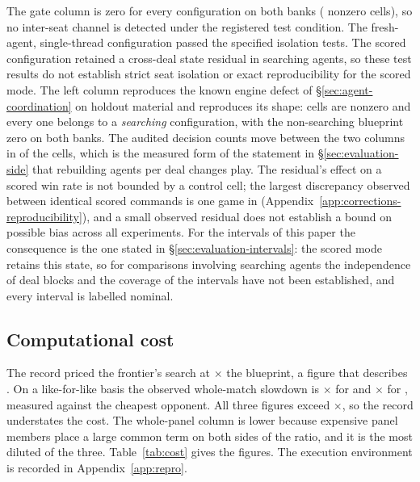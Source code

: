 The gate column is zero for every configuration on both banks (\vsevenSsixGateNonzero{} nonzero
cells), so no inter-seat channel is detected under the registered test condition. The fresh-agent,
single-thread configuration passed the specified isolation tests. The scored configuration retained
a cross-deal state residual in searching agents, so these test results do not establish strict seat
isolation or exact reproducibility for the scored mode. The left column reproduces the known engine
defect of \S\ref{sec:agent-coordination} on holdout material and reproduces its shape:
\vsevenSsixPlainNonzero{} cells are nonzero and every one belongs to a \emph{searching}
configuration, with the non-searching blueprint zero on both banks. The audited decision counts
move between the two columns in \vsevenSsixDenomMoved{} of the cells, which is the measured form of
the statement in \S\ref{sec:evaluation-side} that rebuilding agents per deal changes play. The
residual's effect on a scored win rate is not bounded by a control cell; the largest discrepancy
observed between identical scored commands is one game in \vsevenResidueGames{}
(Appendix~\ref{app:corrections-reproducibility}), and a small observed residual does not establish
a bound on possible bias across all experiments. For the intervals of this paper the consequence is
the one stated in \S\ref{sec:evaluation-intervals}: the scored mode retains this state, so for
comparisons involving searching agents the independence of deal blocks and the coverage of the
intervals have not been established, and every interval is labelled nominal.

\subsection{Computational cost}
\label{sec:results-cost}

The record priced the frontier's search at \vsevenCostRecorded$\times$ the blueprint, a figure that
describes \fcheap{}. On a like-for-like basis the observed whole-match slowdown is
\vsevenCostFcheapTight$\times$ for \fcheap{} and \vsevenCostFrozenTight$\times$ for \sestina{},
measured against the cheapest opponent. All three figures exceed \vsevenCostRecorded$\times$, so the
record understates the cost. The whole-panel column is lower because expensive panel members place a
large common term on both sides of the ratio, and it is the most diluted of the three.
Table~\ref{tab:cost} gives the figures. The execution environment is recorded in
Appendix~\ref{app:repro}.

